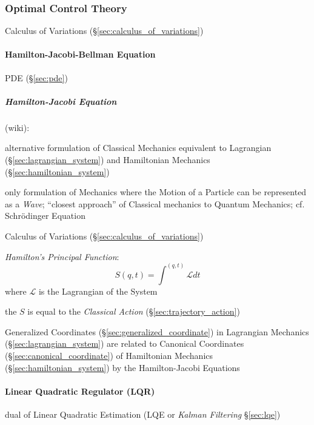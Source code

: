 \subsubsection{Optimal Control Theory}\label{sec:optimal_control}

\fist Calculus of Variations (\S\ref{sec:calculus_of_variations})



\paragraph{Hamilton-Jacobi-Bellman Equation}
\label{sec:hamilton_jacobi_bellman}\hfill

PDE (\S\ref{sec:pde})



\subparagraph{Hamilton-Jacobi Equation}\label{sec:hamilton_jacobi}\hfill

(wiki):

alternative formulation of Classical Mechanics equivalent to Lagrangian
(\S\ref{sec:lagrangian_system}) and Hamiltonian Mechanics
(\S\ref{sec:hamiltonian_system})

only formulation of Mechanics where the Motion of a Particle can be represented
as a \emph{Wave}; ``closest approach'' of Classical mechanics to Quantum
Mechanics; cf. Schr\"odinger Equation

\fist Calculus of Variations (\S\ref{sec:calculus_of_variations})

\emph{Hamilton's Principal Function}:
\[
  S(q,t) = \int^{(q,t)} \mathcal{L} dt
\]
where $\mathcal{L}$ is the Lagrangian of the System

the $S$ is equal to the \emph{Classical Action} (\S\ref{sec:trajectory_action})

Generalized Coordinates (\S\ref{sec:generalized_coordinate}) in Lagrangian
Mechanics (\S\ref{sec:lagrangian_system}) are related to Canonical Coordinates
(\S\ref{sec:canonical_coordinate}) of Hamiltonian Mechanics
(\S\ref{sec:hamiltonian_system}) by the Hamilton-Jacobi Equations



\paragraph{Linear Quadratic Regulator (LQR)}\label{sec:lqr}\hfill

dual of Linear Quadratic Estimation (LQE or \emph{Kalman Filtering}
\S\ref{sec:lqe})



